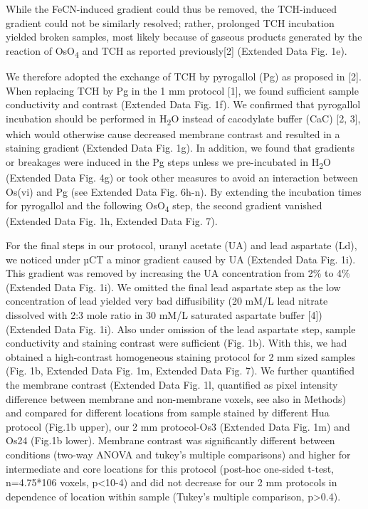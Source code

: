 \documentclass{article}
\begin{document}
While the FeCN-induced gradient could thus be removed, the TCH-induced gradient could not be similarly resolved; rather, prolonged TCH incubation yielded broken samples, most likely because of gaseous products generated by the reaction of OsO\textsubscript{4} and TCH as reported previously[2] (Extended Data Fig. 1e).  

We therefore adopted the exchange of TCH by pyrogallol (Pg) as proposed in [2]. When replacing TCH by Pg in the 1 mm protocol [1], we found sufficient sample conductivity and contrast (Extended Data Fig. 1f). We confirmed that pyrogallol incubation should be performed in H\textsubscript{2}O instead of cacodylate buffer (CaC) [2, 3], which would otherwise cause decreased membrane contrast and resulted in a staining gradient (Extended Data Fig. 1g). In addition, we found that gradients or breakages were induced in the Pg steps unless we pre-incubated in H\textsubscript{2}O (Extended Data Fig. 4g) or took other measures to avoid an interaction between Os(vi) and Pg (see Extended Data Fig. 6h-n). By extending the incubation times for pyrogallol and the following OsO\textsubscript{4} step, the second gradient vanished (Extended Data Fig. 1h,  Extended Data Fig. 7).  

For the final steps in our protocol, uranyl acetate (UA) and lead aspartate (Ld), we noticed under µCT a minor gradient caused by UA (Extended Data Fig. 1i). This gradient was removed by increasing the UA concentration from 2\% to 4\% (Extended Data Fig. 1i). We omitted the final lead aspartate step as the low concentration of lead yielded very bad diffusibility (20 mM/L lead nitrate dissolved with 2:3 mole ratio in 30 mM/L saturated aspartate buffer [4]) (Extended Data Fig. 1i). Also under omission of the lead aspartate step, sample conductivity and staining contrast were sufficient (Fig. 1b). With this, we had obtained a high-contrast homogeneous staining protocol for 2 mm sized samples (Fig. 1b, Extended Data Fig. 1m, Extended Data Fig. 7). We further quantified the membrane contrast (Extended Data Fig. 1l, quantified as pixel intensity difference between membrane and non-membrane voxels, see also in Methods) and compared for different locations from sample stained by different Hua protocol (Fig.1b upper), our 2 mm protocol-Os3 (Extended Data Fig. 1m) and Os24 (Fig.1b lower). Membrane contrast was significantly different between conditions (two-way ANOVA and tukey’s multiple comparisons) and higher for intermediate and core locations for this protocol (post-hoc one-sided t-test, n=4.75*106 voxels, p<10-4) and did not decrease for our 2 mm protocols in dependence of location within sample (Tukey’s multiple comparison, p>0.4).   
\end{document}
